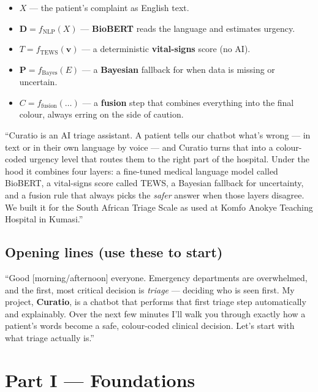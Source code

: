 \documentclass[11pt]{article}
\begin{document}
\begin{itemize}
  \item $X$ --- the patient's complaint as English text.
  \item $\mathbf{D} = f_{\mathrm{NLP}}(X)$ --- \textbf{BioBERT} reads the language and estimates urgency.
  \item $T = f_{\mathrm{TEWS}}(\mathbf{v})$ --- a deterministic \textbf{vital-signs} score (no AI).
  \item $\mathbf{P} = f_{\mathrm{Bayes}}(E)$ --- a \textbf{Bayesian} fallback for when data is missing or uncertain.
  \item $C = f_{\mathrm{fusion}}(\dots)$ --- a \textbf{fusion} step that combines everything into the final colour, always erring on the side of caution.
\end{itemize}

\begin{saybox}
``Curatio is an AI triage assistant. A patient tells our chatbot what's wrong --- in text or in their
own language by voice --- and Curatio turns that into a colour-coded urgency level that routes them to
the right part of the hospital. Under the hood it combines four layers: a fine-tuned medical language
model called BioBERT, a vital-signs score called TEWS, a Bayesian fallback for uncertainty, and a
fusion rule that always picks the \emph{safer} answer when those layers disagree. We built it for the
South African Triage Scale as used at Komfo Anokye Teaching Hospital in Kumasi.''
\end{saybox}

\subsection*{Opening lines (use these to start)}
\begin{saybox}
``Good [morning/afternoon] everyone. Emergency departments are overwhelmed, and the first, most critical
decision is \emph{triage} --- deciding who is seen first. My project, \textbf{Curatio}, is a chatbot that
performs that first triage step automatically and explainably. Over the next few minutes I'll walk you
through exactly how a patient's words become a safe, colour-coded clinical decision. Let's start with
what triage actually is.''
\end{saybox}

\section{Part I --- Foundations}
\end{document}
